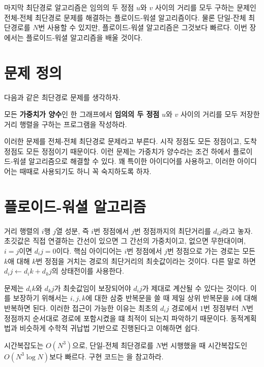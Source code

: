 마지막 최단경로 알고리즘은 임의의 두 정점 $u$와 $v$ 사이의 거리를 모두 구하는 문제인 전체-전체 최단경로 문제를 해결하는 플로이드-워셜 알고리즘이다. 물론 단일-잔체 최단경로를 $N$번 사용할 수 있지만, 플로이드-워셜 알고리즘은 그것보다 빠르다. 이번 장에서는 플로이드-워셜 알고리즘을 배울 것이다.

\section{문제 정의}
다음과 같은 최단경로 문제를 생각하자.

\begin{example} \label{ex: Floyd-Warshall}
    모든 \textbf{가중치가 양수}인 한 그래프에서 \textbf{임의의 두 정점} $u$와 $v$ 사이의 거리를 모두 저장한 거리 행렬을 구하는 프로그램을 작성하라.
\end{example}

이러한 문제를 전체-전체 최단경로 문제라고 부른다. 시작 정점도 모든 정점이고, 도착 정점도 모든 정점이기 때문이다.
이런 문제는 가중치가 양수라는 조건 하에서 플로이드-워셜 알고리즘으로 해결할 수 있다. 꽤 특이한 아이디어를 사용하고, 이러한 아이디어는 때때로 사용되기도 하니 꼭 숙지하도록 하자.

\section{플로이드-워셜 알고리즘}
거리 행렬의 $i$행 $j$열 성분, 즉 $i$번 정점에서 $j$번 정점까지의 최단거리를 $d_ij$라고 놓자. 초깃값은 직접 연결하는 간선이 있으면 그 간선의 가중치이고, 없으면 무한대이며, $i=j$이면 $d_ij=0$이다.
핵심 아이디어는 $i$번 정점에서 $j$번 정점으로 가는 경로는 모든 $k$애 대해 $k$번 정점을 거치는 경로의 최단거리의 최솟값이라는 것이다. 다른 말로 하면 $d_ij \leftarrow d_ik + d_kj$의 상태전이를 사용한다.

문제는 $d_ik$와 $d_kj$가 최솟값임이 보장되어야 $d_ij$가 제대로 계산될 수 있다는 것이다. 이를 보장하기 위해서는 $i, j, k$에 대한 삼중 반복문을 쓸 때 제일 상위 반복문을 $k$에 대해 반복하면 된다.
이러한 접근이 가능한 이유는 최초의 $d_ij$ 경로에서 $1$번 정점부터 $N$번 정점까지 순서대로 경로에 포함시켰을 떄 최적이 되는지 파악하기 때문이다. 동적계획법과 비슷하게 수학적 귀납법 기반으로 진행된다고 이해하면 쉽다.

시간복잡도는 $O(N^3)$으로, 단일-전체 최단경로를 $N$번 시행했을 때 시간복잡도인 $O(N^3 \log N)$보다 빠르다. 구현 코드는 을 참고하라.

